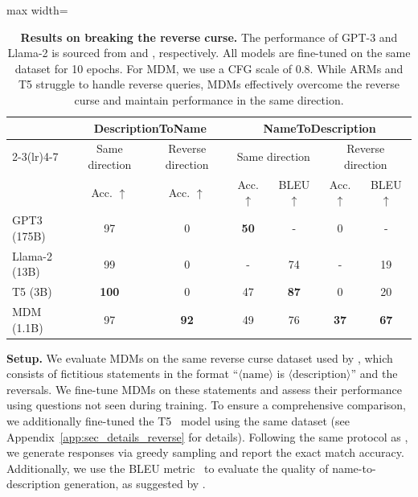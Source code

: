 \documentclass{article} %
\begin{document}
\begin{table}[t!]
    \centering
    \caption{\textbf{Results on breaking the reverse curse.} The performance of GPT-3 and Llama-2 is sourced from \citet{berglund2023reversal} and \citet{lv2023we}, respectively. All models are fine-tuned on the same dataset for 10 epochs. For MDM, we use a CFG scale of 0.8. While ARMs and T5 struggle to handle reverse queries, MDMs effectively overcome the reverse curse and maintain performance in the same direction.}
    \label{tab:reverse_curse}
    \begin{adjustbox}{max width=\textwidth}
    \begin{tabular}{lcccccc}
        \toprule
        &  \multicolumn{2}{c}{DescriptionToName} & \multicolumn{4}{c}{NameToDescription} \\
        \cmidrule(lr){2-3}\cmidrule(lr){4-7}
         &Same direction & Reverse direction & \multicolumn{2}{c}{Same direction} & \multicolumn{2}{c}{Reverse direction} \\
        \midrule
        &  Acc. $\uparrow$ & Acc.  $\uparrow$& Acc. $\uparrow$ & BLEU $\uparrow$ & Acc. $\uparrow$ & BLEU $\uparrow$ \\
        \midrule
        GPT3 (175B)  & 97 & 0 & \textbf{50} & - & 0 & -\\
        \midrule
        Llama-2 (13B)  & 99 & 0 & - & 74 & - & 19 \\
        \midrule
        T5 (3B) & \textbf{100} & 0 & 47 & \textbf{87} & 0 & 20 \\
        \midrule
        MDM (1.1B)  & 97 & \textbf{92} & 49 & 76 & \textbf{37} & \textbf{67}\\
        \bottomrule
    \end{tabular}
    \end{adjustbox}
\end{table}


\textbf{Setup.}  We evaluate MDMs on the same reverse curse dataset used by \citet{berglund2023reversal}, which consists of fictitious statements in the format “$\langle \text{name} \rangle$ is $\langle \text{description} \rangle$” and the reversals. We fine-tune MDMs on these statements and assess their performance using questions not seen during training. To ensure a comprehensive comparison, we additionally fine-tuned the T5~\citep{raffel2020exploring} model using the same dataset (see Appendix~\ref{app:sec_details_reverse} for details). Following the same protocol as \citet{berglund2023reversal}, we generate responses via greedy sampling and report the exact match accuracy. Additionally, we use the BLEU metric~\citep{papineni2002bleu} to evaluate the quality of name-to-description generation, as suggested by \citet{lv2023we}. 
\end{document}
